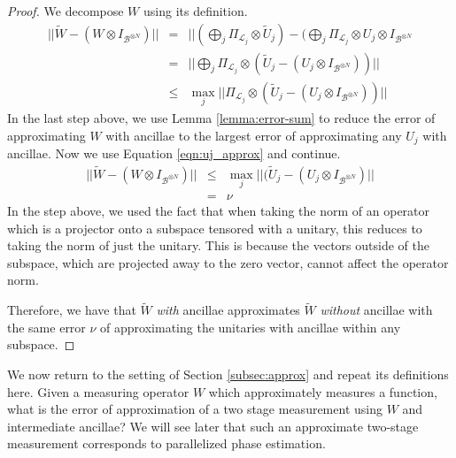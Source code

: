 \begin{proof}
We decompose $W$ using its definition.
%
\begin{eqnarray}
|| \tilde{W} - (W \otimes I_{\mathcal{B}^{\otimes N}}) || & = &
|| (\bigoplus_j \Pi_{\mathcal{L}_j} \otimes \tilde{U}_j) -
   (\bigoplus_j \Pi_{\mathcal{L}_j} \otimes U_j \otimes I_{\mathcal{B}^{\otimes N}}\\
& = & || \bigoplus_j \Pi_{\mathcal{L}_j} \otimes (\tilde{U}_j - (U_j \otimes I_{\mathcal{B}^{\otimes N}})) || \\
& \le & \max_j ||    \Pi_{\mathcal{L}_j} \otimes (\tilde{U}_j - (U_j \otimes I_{\mathcal{B}^{\otimes N}})) ||
\end{eqnarray}
%
In the last step above, we use Lemma \ref{lemma:error-sum} to reduce the
error of approximating $W$ with ancillae to the largest error of approximating
any $U_j$ with ancillae. Now we use Equation \ref{eqn:uj_approx} and continue.
%
\begin{eqnarray}
|| \tilde{W} - (W \otimes I_{\mathcal{B}^{\otimes N}}) || & \le &
\max_j || (\tilde{U}_j - (U_j \otimes I_{\mathcal{B}^{\otimes N}}) || \\
& = & \nu
\end{eqnarray}
%
In the step above, we used the fact that when taking the norm of an operator
which is a projector onto a subspace
tensored with a unitary, this reduces to taking the norm
of just the unitary. This is because the vectors outside of the subspace,
which are projected away to the zero vector, cannot affect the operator norm.

Therefore, we have that $\tilde{W}$ \emph{with} ancillae approximates $\tilde{W}$
\emph{without} ancillae with the same error $\nu$ of approximating the unitaries
with ancillae within any subspace.
\end{proof}

We now return to the setting of Section \ref{subsec:approx} and repeat
its definitions here. Given a measuring operator $W$ which approximately
measures a function, what is the error of approximation
of a two stage measurement using $W$ and intermediate ancillae?
We will see later that such an approximate two-stage measurement
corresponds to parallelized phase estimation.

